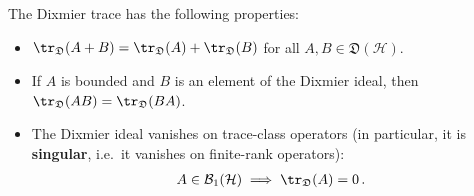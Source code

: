     \begin{property}
        The Dixmier trace has the following properties:
        \begin{itemize}
            \item $\tr_{\mathfrak{D}}(A+B)=\tr_{\mathfrak{D}}(A) + \tr_{\mathfrak{D}}(B)$ for all $A,B\in\mathfrak{D}(\mathcal{H})$.
            \item If $A$ is bounded and $B$ is an element of the Dixmier ideal, then $\tr_{\mathfrak{D}}(AB)=\tr_{\mathfrak{D}}(BA)$.
            \item The Dixmier ideal vanishes on trace-class operators (in particular, it is \textbf{singular}, i.e.~it vanishes on finite-rank operators):
                \begin{gather}
                    A\in\mathcal{B}_1(\mathcal{H})\implies\tr_{\mathfrak{D}}(A)=0\,.
                \end{gather}
        \end{itemize}
    \end{property}